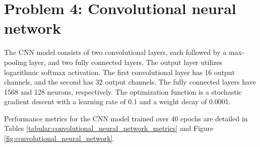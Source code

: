 \documentclass[a4paper]{article}
\begin{document}
\section*{Problem 4: Convolutional neural network}

The CNN model consists of two convolutional layers, each followed by a max-pooling layer, and two fully connected layers. 
The output layer utilizes logarithmic softmax activation. 
The first convolutional layer has 16 output channels, and the second has 32 output channels.
The fully connected layers have 1568 and 128 neurons, respectively.
The optimization function is a stochastic gradient descent with a learning rate of 0.1 and a weight decay of 0.0001.

Performance metrics for the CNN model trained over 40 epochs are detailed in Tables \ref{tabular:convolutional_neural_network_metrics} and Figure \ref{fig:convolutional_neural_network}.
\end{document}
